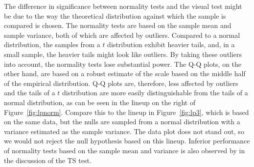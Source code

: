 \documentclass[12pt]{article}\usepackage[]{graphicx}\usepackage[]{color}
\newcommand{\alnote}[1]{\todo[inline,color=green!40]{#1}}
\begin{document}
The difference in significance between normality tests and the visual test might be due to the way the theoretical distribution against which the sample is compared is chosen. The normality tests are based on the sample mean and sample variance, both of which are affected by outliers. Compared to a normal distribution, the samples from a $t$ distribution exhibit heavier tails, and, in a small sample, the heavier tails might look like outliers. By taking these outliers into account, the normality tests lose substantial power. The Q-Q plots, on the other hand, are based on a robust estimate of the scale based on the middle half of the empirical distribution. Q-Q plots are, therefore, less affected by outliers and the tails of a $t$ distribution are more easily distinguishable from the tails of a normal distribution, as can be seen in the lineup on the right of Figure~\ref{fig:lpnorm}. Compare this to the lineup in Figure~\ref{fig:lp3}, which is based on the same data, but the nulls are sampled from a normal distribution with a variance estimated as the sample variance. The data plot does not stand out, so we would not reject the null hypothesis based on this lineup. 
Inferior performance of normality tests based on the sample mean and variance is also observed by \cite{buja:2013} in the discussion of the TS test. 


\end{document}
